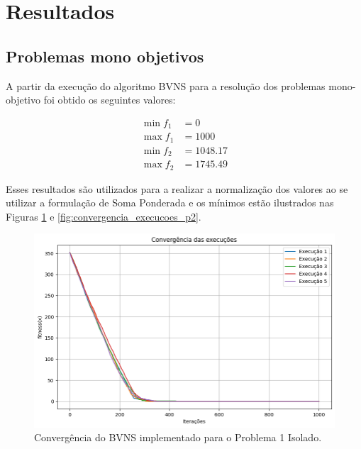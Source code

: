 \documentclass[conference]{IEEEtran}
\begin{document}
\section{Resultados}

\subsection{Problemas mono objetivos}

A partir da execução do algoritmo BVNS para a resolução dos problemas mono-objetivo foi obtido
os seguintes valores:

\begin{align}
\min f_1 &= 0 \\
\max f_1 &= 1000 \\
\min f_2 &= 1048.17 \\
\max f_2 &= 1745.49
\end{align}

Esses resultados são utilizados para a realizar a normalização dos valores ao se utilizar a formulação de Soma Ponderada e os mínimos estão ilustrados nas Figuras \ref{fig:convergencia_execucoes_p1} e \ref{fig:convergencia_execucoes_p2}.

\begin{figure}[htbp]
    \centering
    \includegraphics[width=\columnwidth,trim=1 1 1 1,clip]{convergencia_execucoes_p1.png}
    \caption{\label{fig:convergencia_execucoes_p1}Convergência do BVNS implementado para o Problema 1 Isolado.}
\end{figure}
\end{document}
